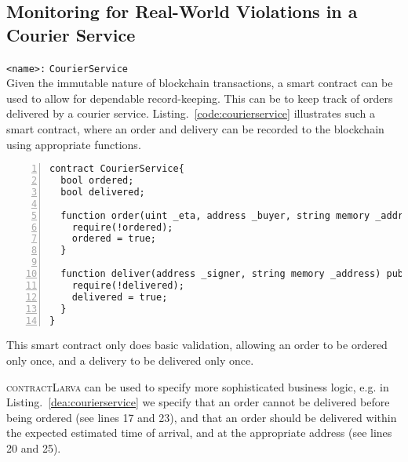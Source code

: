 \documentclass{article}
\newcommand{\contractlarva}{\textsc{contractLarva}\xspace}
\begin{document}

   \subsection{Monitoring for Real-World Violations in a Courier Service} 
   

    \texttt{<name>:} \verb+CourierService+\\
   
    Given the immutable nature of blockchain transactions, a smart contract can be used to allow for dependable record-keeping. This can be to keep track of orders delivered by a courier service. Listing.~\ref{code:courierservice} illustrates such a smart contract, where an order and delivery can be recorded to the blockchain using appropriate functions. 
   
    \small\begin{lstlisting}[language=Solidity,basicstyle=\scriptsize,numbers=left,numbersep=2pt,xleftmargin=0.3cm,label={code:courierservice}, caption={Courier Service smart contract.}]
contract CourierService{
  bool ordered;
  bool delivered;
  
  function order(uint _eta, address _buyer, string memory _address) public{
    require(!ordered);
    ordered = true;
  }
  
  function deliver(address _signer, string memory _address) public{
    require(!delivered);
    delivered = true;
  }
}
    \end{lstlisting}\normalsize
  
  This smart contract only does basic validation, allowing an order to be ordered only once, and a delivery to be delivered only once. 
  
  \contractlarva can be used to specify more sophisticated business logic, e.g. in Listing.~\ref{dea:courierservice} we specify that an order cannot be delivered before being ordered (see lines 17 and 23), and that an order should be delivered within the expected estimated time of arrival, and at the appropriate address (see lines 20 and 25).
\end{document}
